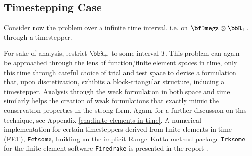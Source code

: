 \subsection*{Timestepping Case}
    
    Consider now the problem over a infinite time interval, i.e. on $\bfOmega\otimes\bbR_{+}$, through a timestepper.
    
     For sake of analysis, restrict $\bbR_{+}$ to some interval $T$. This problem can again be approached through the lens of function/finite element spaces in time, only this time through careful choice of trial and test space to devise a formulation that, upon discretization, exhibits a block-triangular structure, inducing a timestepper. Analysis through the weak formulation in both space and time similarly helps the creation of weak formulations that exactly mimic the conservation properties in the strong form. Again, for a further discussion on this technique, see Appendix \ref{cha:finite elements in time}. A numerical implementation for certain timesteppers derived from finite elements in time (FET), {\tt Fetsome}, building on the implicit Runge–Kutta method package {\tt Irksome} for the finite-element software {\tt Firedrake} is presented in the report \cite{La22}.